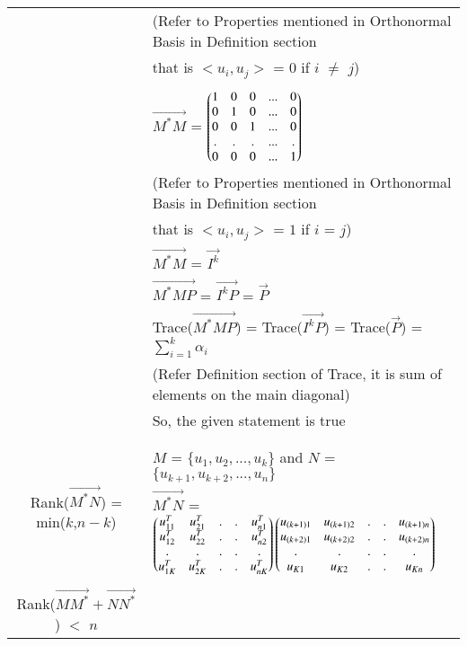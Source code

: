 \documentclass[journal,12pt]{IEEEtran}
\begin{document}
\begin{longtable}{|c|l|}
	 & (Refer to Properties mentioned in Orthonormal Basis in Definition section\\
	 & that is $<u_i,u_j>$ = $0$ if $i$ $\ne$ $j$)\\
	 & \\
	 & $\vec{M^*M}$ = $\begin{pmatrix}1&0&0&...&0\\
	                           0&1&0&...&0\\
	                           0&0&1&...&0\\
	                           .&.&.&...&.\\
	                           0&0&0&...&1\end{pmatrix}$\\
	& (Refer to Properties mentioned in Orthonormal Basis in Definition section\\
	& that is $<u_i,u_j>$ = $1$ if $i$ = $j$)\\
    & $\vec{M^*M}$ = $\vec{I^{k}}$\\
    & $\vec{M^*MP}$ = $\vec{I^{k}P}$ = $\vec{P}$\\
    & Trace($\vec{{M}^*MP}$) = Trace($\vec{I^{k}P}$) =  Trace($\vec{P}$) = $\sum_{i=1}^{k}\alpha_i$\\
    & (Refer Definition section of Trace, it is sum of elements on the main diagonal)\\
    & So, the given statement is true \\
	& \\
	\hline
	\multirow{3}{*}{Rank($\vec{{M}^*N}$) = min($k$,$n-k$)} 
	& \\
	& $M$ = $\{u_1,u_2,...,u_k\}$ and $N$ = $\{u_{k+1},u_{k+2},...,u_n\}$ \\
	& $\vec{M^*N}$ = $\begin{pmatrix}u_{11}^T&u_{21}^T&.&.&u_{n1}^T\\
	                         u_{12}^T&u_{22}^T&.&.&u_{n2}^T\\
	                         .&.&.&.&.\\
	                         u_{1K}^T&u_{2K}^T&.&.&u_{nK}^T\\
	                         \end{pmatrix} \begin{pmatrix}u_{(k+1)1}&u_{(k+1)2}&.&.&u_{(k+1)n}\\
	                         u_{(k+2)1}&u_{(k+2)2}&.&.&u_{(k+2)n}\\
	                         .&.&.&.&.\\
	                         u_{K1}&u_{K2}&.&.&u_{Kn}\\
	                         \end{pmatrix}$\\
	&\\
	\hline
	\multirow{3}{*}{Rank($\vec{M{M}^*}+\vec{N{N}^*}$) $<$ $n$} 

\end{longtable}
\end{document}
